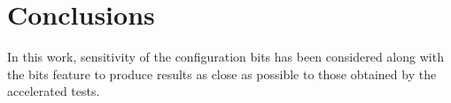 \section{Conclusions}


In this work, sensitivity of the configuration bits has been considered along with the bits feature to
produce results as close as possible to those obtained by the accelerated tests. 



\label{Conclusion}

